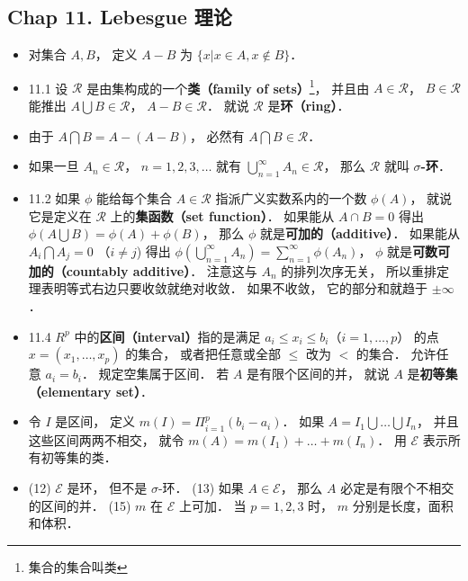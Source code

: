 \subsection{Chap 11. Lebesgue 理论}

\begin{itemize}
\item 对集合 $A, B$， 定义 $A-B$ 为 $\{x|x\in A, x\notin B\}$．

\item 11.1 设 $\mathscr R$ 是由集构成的一个\textbf{类（family of sets）}\footnote{集合的集合叫类}， 并且由 $A\in \mathscr R$， $B\in \mathscr R$ 能推出 $A\bigcup B\in \mathscr R$， $A- B\in \mathscr R$． 就说 $\mathscr R$ 是\textbf{环（ring）}．

\item 由于 $A\bigcap B=A-(A-B)$， 必然有 $A\bigcap B\in \mathscr R$．

\item 如果一旦 $A_n\in \mathscr R$， $n=1,2,3,\dots$ 就有 $\bigcup_{n=1}^\infty A_n \in \mathscr R$， 那么 $\mathscr R$ 就叫 \textbf{$\sigma$-环}．

\item 11.2 如果 $\phi$ 能给每个集合 $A\in \mathscr R$ 指派广义实数系内的一个数 $\phi(A)$， 就说它是定义在 $\mathscr R$ 上的\textbf{集函数（set function）}． 如果能从 $A\cap B=0$ 得出 $\phi(A\bigcup B)=\phi(A)+\phi(B)$， 那么 $\phi$ 就是\textbf{可加的（additive）}． 如果能从 $A_i\bigcap A_j = 0$ （$i\ne j$) 得出 $\phi(\bigcup_{n=1}^\infty A_n) = \sum_{n=1}^\infty \phi(A_n)$， $\phi$ 就是\textbf{可数可加的（countably additive）}． 注意这与 $A_n$ 的排列次序无关， 所以重排定理表明等式右边只要收敛就绝对收敛． 如果不收敛， 它的部分和就趋于 $\pm\infty$．

\item 11.4 $R^p$ 中的\textbf{区间（interval）}指的是满足 $a_i\leqslant x_i\leqslant b_i$（$i=1,\dots,p$） 的点 $x=(x_1,\dots,x_p)$ 的集合， 或者把任意或全部 $\leqslant$ 改为 $<$ 的集合． 允许任意 $a_i=b_i$． 规定空集属于区间． 若 $A$ 是有限个区间的并， 就说 $A$ 是\textbf{初等集（elementary set）}．

\item 令 $I$ 是区间， 定义 $m(I)=\Pi_{i=1}^p (b_i-a_i)$． 如果 $A=I_1\bigcup \dots \bigcup I_n$， 并且这些区间两两不相交， 就令 $m(A)=m(I_1)+\dots+m(I_n)$． 用 $\mathscr E$ 表示所有初等集的类．

\item (12) $\mathscr E$ 是环， 但不是 $\sigma$-环． (13) 如果 $A\in \mathscr E$， 那么 $A$ 必定是有限个不相交的区间的并． (15) $m$ 在 $\mathscr E$ 上可加． 当 $p=1,2,3$ 时， $m$ 分别是长度，面积和体积．


\end{itemize}
